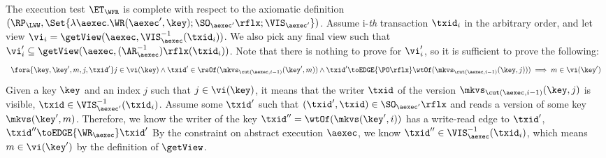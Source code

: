 The execution test $\ET_\WFR$ is complete with respect to the axiomatic definition 
\( (\RP_{\LWW}, \Set{\lambda \aexec. \WR(\aexec', \key) ; \SO_{\aexec'}\rflx ; \VIS_{\aexec'} })\).
Assume i-\emph{th} transaction \( \txid_i \) in the arbitrary order,
and let view \( \vi_{i} = \getView(\aexec, \VIS^{-1}_{\aexec}(\txid_{i}) ) \).
We also pick any final view such that \( \vi'_{i} \subseteq \getView(\aexec, (\AR^{-1}_{\aexec})\rflx(\txid_{i}) ) \).
Note that there is nothing to prove for \( \vi'_i \),
so it is sufficient to prove the following:
\[
    \begin{array}{l}
    \fora{\key, \key', m, j, \txid'} j \in \vi(\key)
    \land \txid' \in \rsOf(\mkvs_{\cut(\aexec, i-1)}(\key', m)) \land \txid' {\toEDGE{\PO\rflx}} \wtOf(\mkvs_{\cut(\aexec, i-1)}(\key, j)) ) 
    \implies m \in \vi(\key')
    \end{array}
\]
Given a key \( \key \) and an index \( j \) such that \( j \in \vi(\key) \), 
it means that the writer \( \txid \) of the version \( \mkvs_{\cut(\aexec, i-1)}(\key, j) \) is visible, \ie \( \txid \in \VIS_{\aexec'}^{-1}(\txid_i) \).
Assume some \( \txid' \) such that \( (\txid', \txid) \in \SO_{\aexec'}\rflx \) and reads a version of some key \( \mkvs(\key',m) \).
Therefore, we know the writer of the key \( \txid'' = \wtOf(\mkvs(\key',i)) \) has a write-read edge to \( \txid' \), \ie \( \txid'' \toEDGE{\WR_\aexec} \txid'\) 
By the constraint on abstract execution \( \aexec \), we know \( \txid'' \in \VIS^{-1}_{\aexec}(\txid_{i}) \),
which means \( m \in \vi(\key')\) by the definition of \( \getView \).
